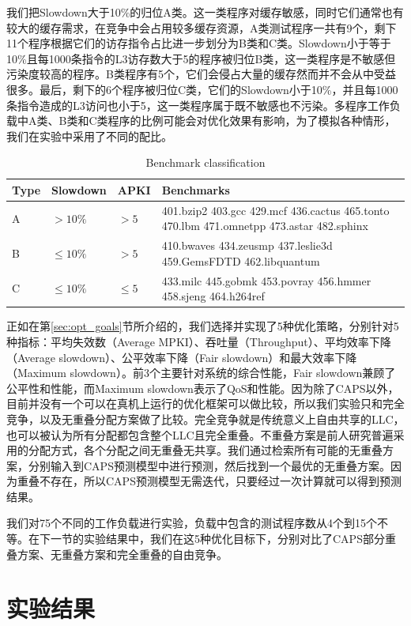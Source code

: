 我们把Slowdown大于10\%的归位A类。这一类程序对缓存敏感，同时它们通常也有较大的缓存需求，在竞争中会占用较多缓存资源，A类测试程序一共有9个，剩下11个程序根据它们的访存指令占比进一步划分为B类和C类。Slowdown小于等于10\%且每1000条指令的L3访存数大于5的程序被归位B类，这一类程序是不敏感但污染度较高的程序。B类程序有5个，它们会侵占大量的缓存然而并不会从中受益很多。最后，剩下的6个程序被归位C类，它们的Slowdown小于10\%，并且每1000条指令造成的L3访问也小于5，这一类程序属于既不敏感也不污染。多程序工作负载中A类、B类和C类程序的比例可能会对优化效果有影响，为了模拟各种情形，我们在实验中采用了不同的配比。

\begin{table}[htbp]
\caption{Benchmark classification}
\label{tab:benchmarks}
\centering
\begin{tabularx} {1\textwidth}{|l|l|l|X| } 
 \hline
 Type & Slowdown & APKI & Benchmarks \\
 \hline
 A & $> 10\%$ & $> 5$ & 401.bzip2 403.gcc 429.mcf 436.cactus 465.tonto 470.lbm 471.omnetpp 473.astar 482.sphinx\\ 
 \hline
 B & $\leq 10\%$ & $> 5$ & 410.bwaves 434.zeusmp 437.leslie3d 459.GemsFDTD 462.libquantum\\ 
 \hline
 C & $\leq 10\%$ & $\leq 5$ & 433.milc 445.gobmk 453.povray 456.hmmer 458.sjeng 464.h264ref\\
 \hline 
\end{tabularx}
\end{table}

正如在第\ref{sec:opt_goals}节所介绍的，我们选择并实现了5种优化策略，分别针对5种指标：平均失效数（Average MPKI）、吞吐量（Throughput）、平均效率下降（Average slowdown）、公平效率下降（Fair slowdown）和最大效率下降（Maximum slowdown）。前3个主要针对系统的综合性能，Fair slowdown兼顾了公平性和性能，而Maximum slowdown表示了QoS和性能。因为除了CAPS以外，目前并没有一个可以在真机上运行的优化框架可以做比较，所以我们实验只和完全竞争，以及无重叠分配方案做了比较。完全竞争就是传统意义上自由共享的LLC，也可以被认为所有分配都包含整个LLC且完全重叠。不重叠方案是前人研究普遍采用的分配方式，各个分配之间无重叠无共享。我们通过检索所有可能的无重叠方案，分别输入到CAPS预测模型中进行预测，然后找到一个最优的无重叠方案。因为重叠不存在，所以CAPS预测模型无需迭代，只要经过一次计算就可以得到预测结果。

我们对75个不同的工作负载进行实验，负载中包含的测试程序数从4个到15个不等。在下一节的实验结果中，我们在这5种优化目标下，分别对比了CAPS部分重叠方案、无重叠方案和完全重叠的自由竞争。

\section{实验结果}

